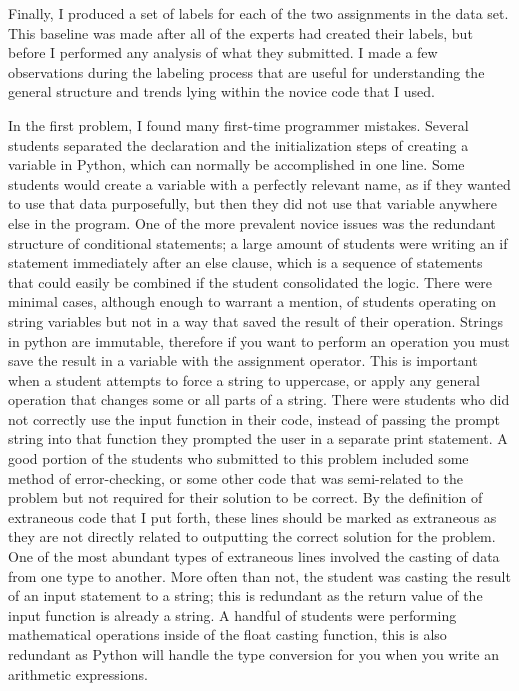 \documentclass[draft]{article}
\begin{document}


Finally, I produced a set of labels for each of the two assignments in the data set. This baseline was made after all of the experts had created their labels, but before I performed any analysis of what they submitted. I made a few observations during the labeling process that are useful for understanding the general structure and trends lying within the novice code that I used. 

In the first problem, I found many first-time programmer mistakes. Several students separated the declaration and the initialization steps of creating a variable in Python, which can normally be accomplished in one line. Some students would create a variable with a perfectly relevant name, as if they wanted to use that data purposefully, but then they did not use that variable anywhere else in the program. One of the more prevalent novice issues was the redundant structure of conditional statements; a large amount of students were writing an if statement immediately after an else clause, which is a sequence of statements that could easily be combined if the student consolidated the logic. There were minimal cases, although enough to warrant a mention, of students operating on string variables but not in a way that saved the result of their operation. Strings in python are immutable, therefore if you want to perform an operation you must save the result in a variable with the assignment operator. This is important when a student attempts to force a string to uppercase, or apply any general operation that changes some or all parts of a string. There were students who did not correctly use the input function in their code, instead of passing the prompt string into that function they prompted the user in a separate print statement. A good portion of the students who submitted to this problem included some method of error-checking, or some other code that was semi-related to the problem but not required for their solution to be correct. By the definition of extraneous code that I put forth, these lines should be marked as extraneous as they are not directly related to outputting the correct solution for the problem. One of the most abundant types of extraneous lines involved the casting of data from one type to another. More often than not, the student was casting the result of an input statement to a string; this is redundant as the return value of the input function is already a string. A handful of students were performing mathematical operations inside of the float casting function, this is also redundant as Python will handle the type conversion for you when you write an arithmetic expressions. 
\end{document}
